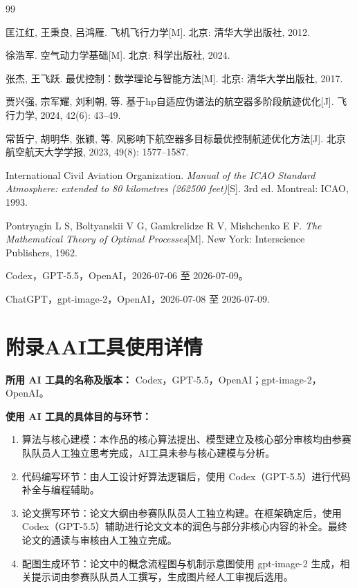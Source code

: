 \documentclass[withoutpreface,bwprint]{cumcmthesis}
\begin{document}
\newpage
\begin{thebibliography}{99}


 匡江红, 王秉良, 吕鸿雁. 飞机飞行力学[M]. 北京: 清华大学出版社, 2012.

 徐浩军. 空气动力学基础[M]. 北京: 科学出版社, 2024.

 张杰, 王飞跃. 最优控制：数学理论与智能方法[M]. 北京: 清华大学出版社, 2017.

 贾兴强, 宗军耀, 刘利朝, 等. 基于hp自适应伪谱法的航空器多阶段航迹优化[J]. 飞行力学, 2024, 42(6): 43--49.

 常哲宁, 胡明华, 张颖, 等. 风影响下航空器多目标最优控制航迹优化方法[J]. 北京航空航天大学学报, 2023, 49(8): 1577--1587.

 International Civil Aviation Organization. \emph{Manual of the ICAO Standard Atmosphere: extended to 80 kilometres (262500 feet)}[S]. 3rd ed. Montreal: ICAO, 1993.

 Pontryagin L S, Boltyanskii V G, Gamkrelidze R V, Mishchenko E F. \emph{The Mathematical Theory of Optimal Processes}[M]. New York: Interscience Publishers, 1962.

 Codex，GPT-5.5，OpenAI，2026-07-06 至 2026-07-09。

 ChatGPT，gpt-image-2，OpenAI，2026-07-08 至 2026-07-09.

\end{thebibliography}

\appendix

\section*{附录A\quad AI工具使用详情}

\textbf{所用 AI 工具的名称及版本：} Codex，GPT-5.5，OpenAI\cite{codex}；gpt-image-2，OpenAI\cite{gptimage2}。

\textbf{使用 AI 工具的具体目的与环节：}
\begin{enumerate}[leftmargin=*]
	\item 算法与核心建模：本作品的核心算法提出、模型建立及核心部分审核均由参赛队队员人工独立思考完成，AI工具未参与核心建模与分析。
	\item 代码编写环节：由人工设计好算法逻辑后，使用 Codex（GPT-5.5）进行代码补全与编程辅助。
	\item 论文撰写环节：论文大纲由参赛队队员人工独立构建。在框架确定后，使用 Codex（GPT-5.5）辅助进行论文文本的润色与部分非核心内容的补全。最终论文的通读与审核由人工独立完成。
	\item 配图生成环节：论文中的概念流程图与机制示意图使用 gpt-image-2 生成，相关提示词由参赛队队员人工撰写，生成图片经人工审视后选用。
\end{enumerate}
\end{document}
